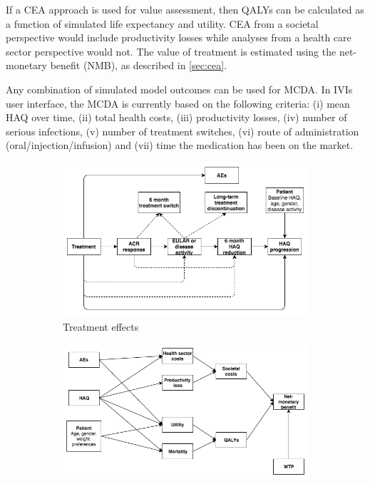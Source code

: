 \documentclass[11pt,final,fleqn]{article}\usepackage[]{graphicx}\usepackage[]{color}
\theoremstyle{plain}
\begin{document}
If a CEA approach is used for value assessment, then QALYs can be calculated as a function of simulated life expectancy and utility. CEA from a societal perspective would include productivity losses while analyses from a health care sector perspective would not. The value of treatment is estimated using the net-monetary benefit (NMB), as described in \autoref{sec:cea}.

Any combination of simulated model outcomes can be used for MCDA. In IVIs user interface, the MCDA is currently based on the following criteria: (i) mean HAQ over time, (ii) total health costs, (iii) productivity losses, (iv) number of serious infections, (v) number of treatment switches, (vi) route of administration (oral/injection/infusion) and (vii) time the medication has been on the market.

\begin{figure}
\centering
\begin{subfigure}{\textwidth}
\includegraphics[width=\textwidth]{influence-diagram-a.png}
\caption{Treatment effects} \label{subfig:treatment-effects}
\end{subfigure}
\begin{subfigure}{\textwidth}
\includegraphics[width=\textwidth]{influence-diagram-b.png}

\end{subfigure}
\end{figure}
\end{document}
